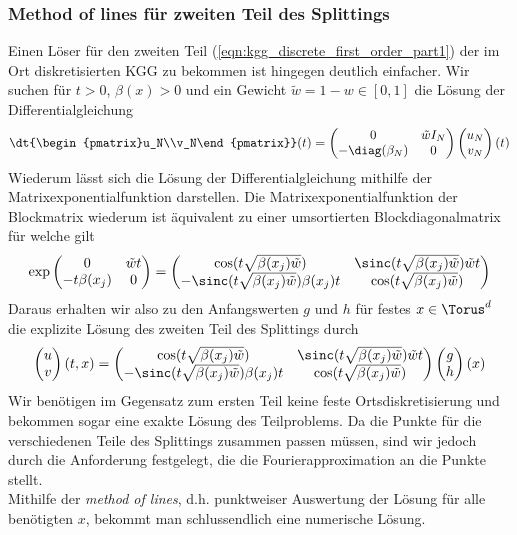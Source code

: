 \subsubsection*{Method of lines für zweiten Teil des Splittings}
Einen Löser für den zweiten Teil (\ref{eqn:kgg_discrete_first_order_part1}) der im Ort diskretisierten KGG zu bekommen ist hingegen deutlich einfacher. Wir suchen für $t>0$, $\beta(x)>0$ und ein Gewicht $\tilde{w}=1-w\in [0,1]$ die Lösung der Differentialgleichung
\begin{equation*}
\dt{\begin{pmatrix}u_N\\v_N\end{pmatrix}}(t)=
\begin{pmatrix}0 & \tilde{w}I_N\\ -\diag({\beta_N}) & 0\end{pmatrix}
\begin{pmatrix}u_N\\v_N\end{pmatrix}(t)
\end{equation*}
Wiederum lässt sich die Lösung der Differentialgleichung mithilfe der Matrixexponentialfunktion darstellen. Die Matrixexponentialfunktion der Blockmatrix wiederum ist äquivalent zu einer umsortierten Blockdiagonalmatrix für welche gilt
\[\exp\begin{pmatrix}0 & \tilde{w}t\\ -t\beta(x_j) & 0\end{pmatrix}=
\begin{pmatrix}\cos(t\sqrt{\beta(x_j)\tilde{w}}) & \sinc(t\sqrt{\beta(x_j)\tilde{w}})\tilde{w}t\\
-\sinc(t\sqrt{\beta(x_j)\tilde{w}})\beta(x_j)t & \cos(t\sqrt{\beta(x_j)\tilde{w}})\end{pmatrix}\]
Daraus erhalten wir also zu den Anfangswerten $g$ und $h$ für festes $x\in \Torus^d$ die explizite Lösung des zweiten Teil des Splittings durch
\[\begin{pmatrix}u\\v\end{pmatrix}(t,x)=
\begin{pmatrix}\cos(t\sqrt{\beta(x_j)\tilde{w}}) & \sinc(t\sqrt{\beta(x_j)\tilde{w}})\tilde{w}t\\
-\sinc(t\sqrt{\beta(x_j)\tilde{w}})\beta(x_j)t & \cos(t\sqrt{\beta(x_j)\tilde{w}})\end{pmatrix}
\begin{pmatrix}g\\h\end{pmatrix}(x)\]
Wir benötigen im Gegensatz zum ersten Teil keine feste Ortsdiskretisierung und bekommen sogar eine exakte Lösung des Teilproblems. Da die Punkte für die verschiedenen Teile des Splittings zusammen passen müssen, sind wir jedoch durch die Anforderung festgelegt, die die Fourierapproximation an die Punkte stellt.\\
Mithilfe der \emph{method of lines}, d.h. punktweiser Auswertung der Lösung für alle benötigten $x$, bekommt man schlussendlich eine numerische Lösung.
